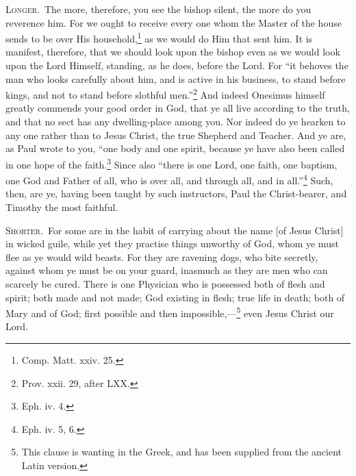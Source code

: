 \textsc{Longer.}~The more, therefore, you see the bishop silent, the more do you reverence him. For we ought to receive every one whom the Master of the house sends to be over His household,\footnote{Comp. Matt. xxiv. 25.} as we would do Him that sent him. It is manifest, therefore, that we should look upon the bishop even as we would look upon the Lord Himself, standing, as he does, before the Lord. For “it behoves the man who looks carefully about him, and is active in his business, to stand before kings, and not to stand before slothful men.”\footnote{Prov. xxii. 29, after LXX.} And indeed Onesimus himself greatly commends your good order in God, that ye all live according to the truth, and that no sect has any dwelling-place among you. Nor indeed do ye hearken to any one rather than to Jesus Christ, the true Shepherd and Teacher. And ye are, as Paul wrote to you, “one body and one spirit, because ye have also been called in one hope of the faith.\footnote{Eph. iv. 4.} Since also “there is one Lord, one faith, one baptism, one God and Father of all, who is over all, and through all, and in all.”\footnote{Eph. iv. 5, 6.} Such, then, are ye, having been taught by such instructors, Paul the Christ-bearer, and Timothy the most faithful.


\textsc{Shorter.}~For some are in the habit of carrying about the name [of Jesus Christ] in wicked guile, while yet they practise things unworthy of God, whom ye must flee as ye would wild beasts. For they are ravening dogs, who bite secretly, against whom ye must be on your guard, inasmuch as they are men who can scarcely be cured. There is one Physician who is possessed both of flesh and spirit; both made and not made; God existing in flesh; true life in death; both of Mary and of God; first possible and then impossible,—\footnote{This clause is wanting in the Greek, and has been supplied from the ancient Latin version.} even Jesus Christ our Lord.


